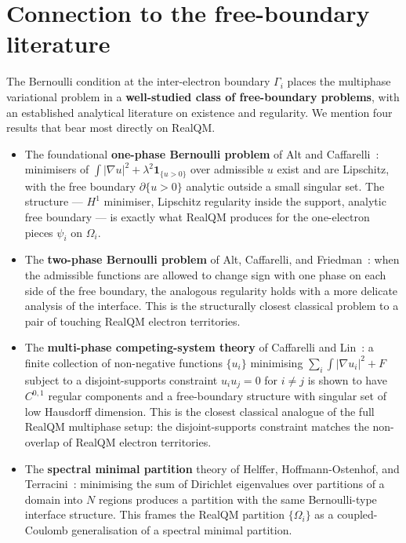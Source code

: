 \section{Connection to the free-boundary literature}\label{sec:freebdy-lit}

The Bernoulli condition at the inter-electron boundary $\Gamma_i$ places the multiphase variational problem in a \textbf{well-studied class of free-boundary problems}, with an established analytical literature on existence and regularity. We mention four results that bear most directly on RealQM.

\begin{itemize}
\item The foundational \textbf{one-phase Bernoulli problem} of Alt and Caffarelli~\cite{AltCaffarelli81}: minimisers of $\int |\nabla u|^2 + \lambda^2 \mathbf{1}_{\{u>0\}}$ over admissible $u$ exist and are Lipschitz, with the free boundary $\partial\{u > 0\}$ analytic outside a small singular set. The structure --- $H^1$ minimiser, Lipschitz regularity inside the support, analytic free boundary --- is exactly what RealQM produces for the one-electron pieces $\psi_i$ on $\Omega_i$.

\item The \textbf{two-phase Bernoulli problem} of Alt, Caffarelli, and Friedman~\cite{AltCaffarelliFriedman84}: when the admissible functions are allowed to change sign with one phase on each side of the free boundary, the analogous regularity holds with a more delicate analysis of the interface. This is the structurally closest classical problem to a pair of touching RealQM electron territories.

\item The \textbf{multi-phase competing-system theory} of Caffarelli and Lin~\cite{CaffarelliLin08}: a finite collection of non-negative functions $\{u_i\}$ minimising $\sum_i \int |\nabla u_i|^2 + F$ subject to a disjoint-supports constraint $u_i u_j = 0$ for $i \ne j$ is shown to have $C^{0,1}$ regular components and a free-boundary structure with singular set of low Hausdorff dimension. This is the closest classical analogue of the full RealQM multiphase setup: the disjoint-supports constraint matches the non-overlap of RealQM electron territories.

\item The \textbf{spectral minimal partition} theory of Helffer, Hoffmann-Ostenhof, and Terracini~\cite{HHOT09}: minimising the sum of Dirichlet eigenvalues over partitions of a domain into $N$ regions produces a partition with the same Bernoulli-type interface structure. This frames the RealQM partition $\{\Omega_i\}$ as a coupled-Coulomb generalisation of a spectral minimal partition.
\end{itemize}

